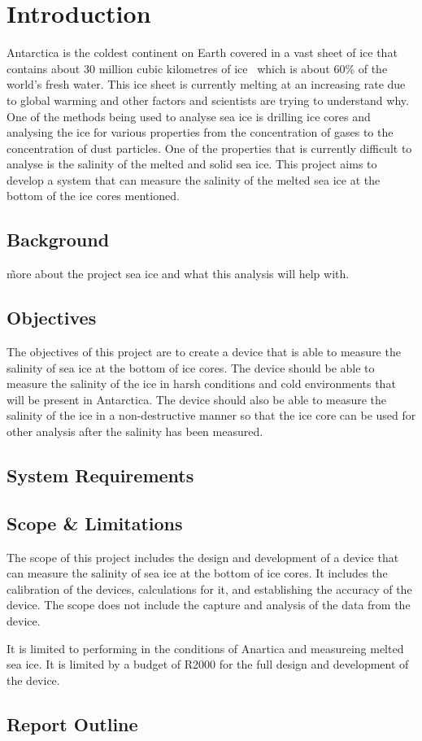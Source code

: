 
\chapter{Introduction}

Antarctica is the coldest continent on Earth covered in a vast sheet of ice that contains about 30 million cubic kilometres of ice~\cite{NSIDC_ice_sheet_facts_2024} which is about 60\% of the world's fresh water.
This ice sheet is currently melting at an increasing rate due to global warming and other factors and scientists are trying to understand why.
One of the methods being used to analyse sea ice is drilling ice cores and analysing the ice for various properties from the concentration of gases to the concentration of dust particles.
One of the properties that is currently difficult to analyse is the salinity of the melted and solid sea ice.
This project aims to develop a system that can measure the salinity of the melted sea ice at the bottom of the ice cores mentioned. 

\section{Background}
\~ more about the project sea ice and what this analysis will help with.

\section{Objectives}
The objectives of this project are to create a device that is able to measure the salinity of sea ice at the bottom of ice cores.
The device should be able to measure the salinity of the ice in harsh conditions and cold environments that will be present in Antarctica.
The device should also be able to measure the salinity of the ice in a non-destructive manner so that the ice core can be used for other analysis after the salinity has been measured.

\section{System Requirements}
\lipsum[1]

\section{Scope \& Limitations}
The scope of this project includes the design and development of a device that can measure the salinity of sea ice at the bottom of ice cores.
It includes the calibration of the devices, calculations for it, and establishing the accuracy of the device.
The scope does not include the capture and analysis of the data from the device.

It is limited to performing in the conditions of Anartica and measureing melted sea ice.
It is limited by a budget of R2000 for the full design and development of the device.

\section{Report Outline}
\lipsum[1]